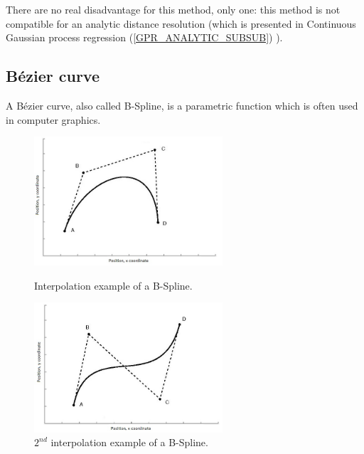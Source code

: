 There are no real disadvantage for this method, only one: this method is not compatible for an analytic distance resolution (which is presented in Continuous Gaussian process regression (\ref{GPR_ANALYTIC_SUBSUB}) ).

\clearpage

\subsection{B\'{e}zier curve}

A B\'{e}zier curve, also called B-Spline, is a parametric function which is often used in computer graphics.

\begin{figure}[H]
    \begin{minipage}[b]{0.5\linewidth}
        \centering
        \includegraphics[width=7cm]{img/bspline.jpg}
		\caption[Caption for LOF]{Interpolation example of a B-Spline.\footnotemark}
		\label{bezier_example}
    \end{minipage}
    \begin{minipage}[b]{0.5\linewidth}
        \centering 
        \includegraphics[width=7cm]{img/bspline2.jpg}
		\caption[Caption for LOF]{$2^{nd}$ interpolation example of a B-Spline.\footnotemark}
		\label{bezier_example2}
    \end{minipage}\hfill
\end{figure}


